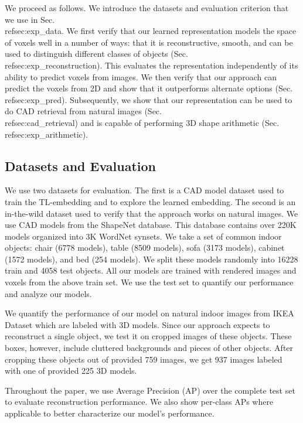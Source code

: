 \documentclass[runningheads]{llncs}
\begin{document}
We proceed as follows. We introduce the datasets and evaluation criterion that we use in Sec.\\ref{sec:exp_data}.
We first verify that our learned representation models the space
of voxels well in a number of ways: that it is reconstructive, smooth, and can be used
to distinguish different classes of objects (Sec.\\ref{sec:exp_reconstruction}). This evaluates the representation
independently of its ability to predict voxels from images. We then  verify that
our approach can predict the voxels from 2D and show that it outperforms alternate options (Sec.\\ref{sec:exp_pred}). Subsequently, we show that our representation can
be used to do CAD retrieval from natural images (Sec.\\ref{sec:cad_retrieval}) and is capable of performing 3D shape arithmetic  (Sec.\\ref{sec:exp_arithmetic}).

\subsection{Datasets and Evaluation}\label{sec:exp_data}

We use two datasets for evaluation. The first is a CAD model dataset
used to train the TL-embedding and to explore the learned embedding. The second
is an in-the-wild dataset used to verify that the
approach works on natural
images.%
We use CAD models from the ShapeNet\cite{3dshapenet} database. This database contains over
220K models organized into 3K WordNet synsets. We take a set of common indoor
objects: chair (6778 models), table (8509 models), sofa (3173 models), cabinet
(1572 models), and bed (254 models). We split these models randomly into 16228 train 
and 4058 test objects. All our models are trained with rendered images 
and voxels from the above train set. We use the test set to 
quantify our performance and analyze our models.
\par%
We quantify the performance of our model on natural indoor images %
from IKEA Dataset \cite{Lim13} which are labeled with 3D models.
Since our approach expects to reconstruct a single
object, we test it on cropped images of these objects.
These boxes, however, include cluttered backgrounds and pieces of other objects.
After cropping these objects out of provided 759 images, we get 937 images labeled with one of provided 225 3D models.
\par%
Throughout the paper, we use Average Precision (AP) over the complete test set
to evaluate reconstruction performance. We also show per-class APs where applicable
to better characterize our model's performance.
\end{document}

